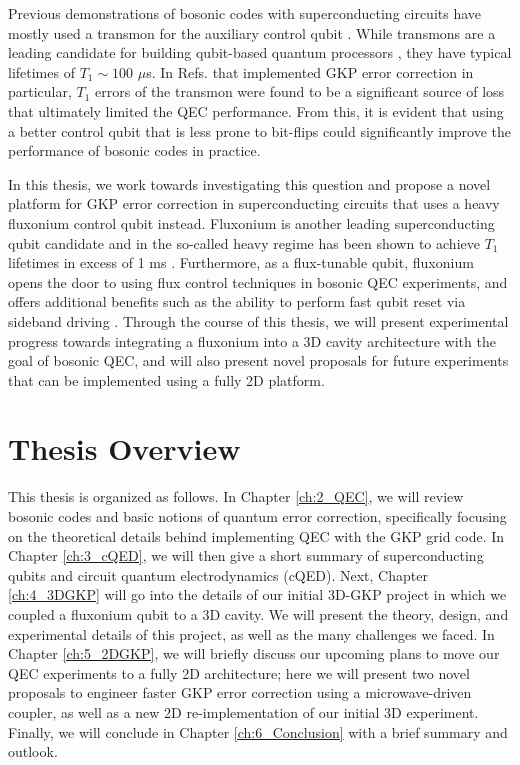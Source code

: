 Previous demonstrations of bosonic codes with superconducting circuits have mostly used a transmon \cite{koch2007charge} for the auxiliary control qubit \cite{ofek2016extending, hu2019quantum, gertler2021protecting, campagne2020gkp-expt, sivak2023gkp-expt, nordquantique2023gkp-expt}. While transmons are a leading candidate for building qubit-based quantum processors \cite{krantz2019quantum, kjaergaard2020superconducting}, they have typical lifetimes of $T_1 \sim 100$ $\mu$s. In Refs. \cite{campagne2020gkp-expt, sivak2023gkp-expt, nordquantique2023gkp-expt} that implemented GKP error correction in particular, $T_1$ errors of the transmon were found to be a significant source of loss that ultimately limited the QEC performance. From this, it is evident that using a better control qubit that is less prone to bit-flips could significantly improve the performance of bosonic codes in practice. 

In this thesis, we work towards investigating this question and propose a novel platform for GKP error correction in superconducting circuits that uses a heavy fluxonium control qubit instead. Fluxonium is another leading superconducting qubit candidate and in the so-called heavy regime has been shown to achieve $T_1$ lifetimes in excess of 1 ms \cite{earnest2018realization, lin2018demonstration, zhang2021universal, ding2023FTF}. Furthermore, as a flux-tunable qubit, fluxonium opens the door to using flux control techniques in bosonic QEC experiments, and offers additional benefits such as the ability to perform fast qubit reset via sideband driving \cite{najera2024high, nie2024parametrically}. Through the course of this thesis, we will present experimental progress towards integrating a fluxonium into a 3D cavity architecture with the goal of bosonic QEC, and will also present novel proposals for future experiments that can be implemented using a fully 2D platform. 

\section{Thesis Overview}
This thesis is organized as follows. In Chapter \ref{ch:2_QEC}, we will review bosonic codes and basic notions of quantum error correction, specifically focusing on the theoretical details behind implementing QEC with the GKP grid code. In Chapter \ref{ch:3_cQED}, we will then give a short summary of superconducting qubits and circuit quantum electrodynamics (cQED). Next, Chapter \ref{ch:4_3DGKP} will go into the details of our initial 3D-GKP project in which we coupled a fluxonium qubit to a 3D cavity. We will present the theory, design, and experimental details of this project, as well as the many challenges we faced. In Chapter \ref{ch:5_2DGKP}, we will briefly discuss our upcoming plans to move our QEC experiments to a fully 2D architecture; here we will present two novel proposals to engineer faster GKP error correction using a microwave-driven coupler, as well as a new 2D re-implementation of our initial 3D experiment. Finally, we will conclude in Chapter \ref{ch:6_Conclusion} with a brief summary and outlook.


